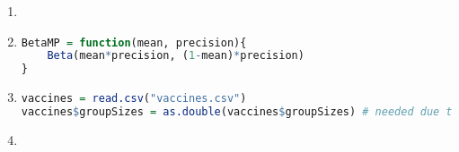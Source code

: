 \documentclass{article}
\begin{document}



\begin{enumerate}
\item 




\item 
\begin{lstlisting}[language=R]
BetaMP = function(mean, precision){
    Beta(mean*precision, (1-mean)*precision)
}


\end{lstlisting}


\item 
\begin{lstlisting}[language=R]
vaccines = read.csv("vaccines.csv")
vaccines$groupSizes = as.double(vaccines$groupSizes) # needed due to bug in Binom code
\end{lstlisting}


\item 
\begin{lstlisting}[language=R]


\end{lstlisting}


\end{enumerate}












 
\end{document}
